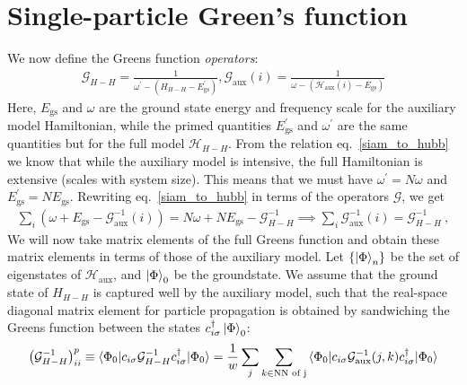 \documentclass[10pt]{report}
\numberwithin{equation}{section}
\begin{document}
\section{Single-particle Green's function}
We now define the Greens function {\it operators}:
\begin{equation}\begin{aligned}
	\mathcal{G}_{H-H} = \frac{1}{\omega^\prime - \left(H_{H-H} - E_\text{gs}^\prime\right) }, \mathcal{G}_\text{aux}(i) = \frac{1}{\omega - \left(\mathcal{H}_\text{aux}(i) - E_\text{gs}\right)}
\end{aligned}\end{equation}
Here, \(E_\text{gs}\) and \(\omega\) are the ground state energy and frequency scale for the auxiliary model Hamiltonian, while the primed quantities \(E_\text{gs}^\prime\) and \(\omega^\prime\) are the same quantities but for the full model \(\mathcal{H}_{H-H}\). From the relation eq.~\ref{siam_to_hubb} we know that while the auxiliary model is intensive, the full Hamiltonian is extensive (scales with system size). This means that we must have \(\omega^\prime = N\omega\) and \(E_\text{gs}^\prime = N E_\text{gs}\).
Rewriting eq.~\ref{siam_to_hubb} in terms of the operators \(\mathcal{G}\), we get
\begin{equation}\begin{aligned}
\sum_i \left(\omega + E_\text{gs} - \mathcal{G}^{-1}_\text{aux}(i)\right) = N\omega + N E_\text{gs} - \mathcal{G}^{-1}_{H-H} \implies \sum_i \mathcal{G}^{-1}_\text{aux}(i) = \mathcal{G}^{-1}_{H-H}~,
\end{aligned}\end{equation}
We will now take matrix elements of the full Greens function and obtain these matrix elements in terms of those of the auxiliary model. Let \(\left\{ \ket{\Phi}_n \right\} \) be the set of eigenstates of \(\mathcal{H}_\text{aux}\), and \(\ket{\Phi}_0\) be the groundstate. We assume that the ground state of \(H_{H-H}\) is captured well by the auxiliary model, such that the real-space diagonal matrix element for particle propagation is obtained by sandwiching the Greens function between the states \(c^\dagger_{i\sigma}\ket{\Phi}_0\):
\begin{equation}\begin{aligned}
	\left(\mathcal{G}^{-1}_{H-H}\right)^p_{ii} \equiv \braket{\Phi_0 | c_{i\sigma} \mathcal{G}^{-1}_{H-H} c^\dagger_{i\sigma} | \Phi_0} = \frac{1}{w}\sum_j \sum_{k \in \text{NN of j}}\braket{\Phi_0 | c_{i\sigma} \mathcal{G}^{-1}_\text{aux}(j,k) c^\dagger_{i\sigma} | \Phi_0}
\end{aligned}\end{equation}
\end{document}
